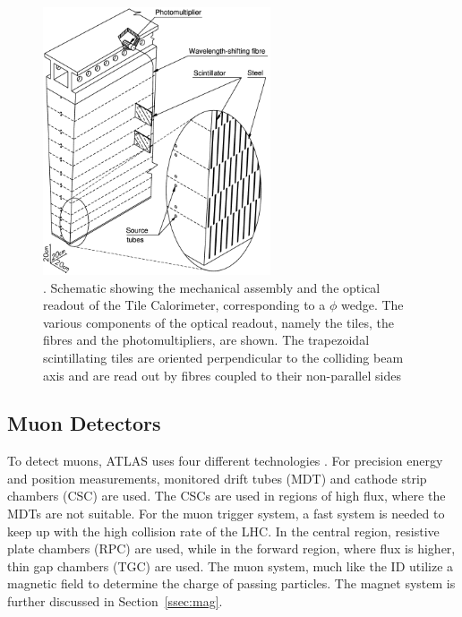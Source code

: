 \begin{figure}[h]
\begin{center}
\includegraphics*[width=0.60\textwidth] {figures/Schematic-showing-the-mechanical-assembly-and-the-optical-readout-of-the-Tile}%
\caption[tile readout]{. Schematic showing the mechanical assembly and the optical readout of
the Tile Calorimeter, corresponding to a ${\phi}$ wedge. The various components of
the optical readout, namely the tiles, the fibres and the photomultipliers, are
shown. The trapezoidal scintillating tiles are oriented perpendicular to the
colliding beam axis and are read out by fibres coupled to their non-parallel
sides \cite{HenriquesCorreia:2004868}}
\label{fig:tile}
\end{center}
\end{figure}


\subsection{Muon Detectors}

To detect muons, ATLAS uses four different technologies \cite{CERN-LHCC-97-022}. For precision energy and position measurements, monitored drift tubes (MDT) and cathode strip chambers (CSC) are used. The CSCs are used in regions of high flux, where the MDTs are not suitable.  For the muon trigger system, a fast system is needed to keep up with the high collision rate of the LHC. In the central region, resistive plate chambers (RPC) are used, while in the forward region, where flux is higher, thin gap chambers (TGC) are used. The muon system, much like the ID utilize a magnetic field to determine the charge of passing particles. The magnet system is further discussed in Section~\ref{ssec:mag}.\linebreak

